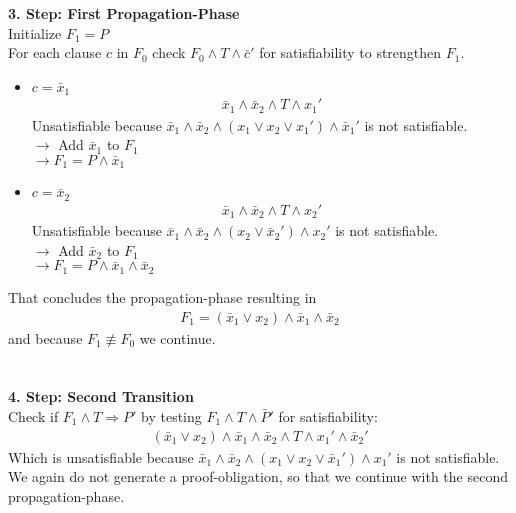 \documentclass[11pt, a4paper, BCOR=10mm, ngerman, oneside]{scrbook}
\begin{document}
\textbf{3. Step: First Propagation-Phase} \\ Initialize $F_1 = P$ \\
For each clause $c$ in $F_0$ check $F_0 \land T \land \bar c'$ for satisfiability to strengthen $F_1$. \\
\begin{itemize}
\item $c = \bar x_1$
\begin{align*}
\bar x_1 \land \bar x_2 \land T \land x_1'
\end{align*}
Unsatisfiable because $\bar x_1 \land \bar x_2 \land (x_1 \lor x_2 \lor x_1') \land \bar x_1'$ is not satisfiable.\\ $\rightarrow$ Add $\bar x_1$ to $F_1$ \\ $\rightarrow F_1 = P \land \bar x_1$ \\

\item$c = \bar x_2$
\begin{align*}
\bar x_1 \land \bar x_2 \land T \land x_2'
\end{align*}
Unsatisfiable because $\bar x_1 \land \bar x_2 \land (x_2 \lor \bar x_2') \land x_2'$ is not satisfiable. \\ $\rightarrow$ Add $\bar x_2$ to $F_1$ \\ $\rightarrow F_1 = P \land \bar x_1 \land \bar x_2$
\end{itemize}
That concludes the propagation-phase resulting in
\begin{align*}
F_1 =(\bar x_1 \lor x_2) \land \bar x_1 \land \bar x_2
\end{align*}
and because $F_1 \not\equiv F_0$ we continue. \\ \\ \\

\textbf{4. Step: Second Transition} \\
Check if $F_1 \land T \Rightarrow P'$ by testing $F_1 \land T \land \bar P'$ for satisfiability: 
\begin{align*}
(\bar x_1 \lor x_2) \land \bar x_1 \land \bar x_2 \land T \land x_1' \land \bar x_2'
\end{align*}
Which is unsatisfiable because $\bar x_1 \land \bar x_2 \land (x_1 \lor x_2 \lor \bar x_1') \land x_1'$ is not satisfiable. We again do not generate a proof-obligation, so that we continue with the second propagation-phase. \\ \\ \\
\end{document}
